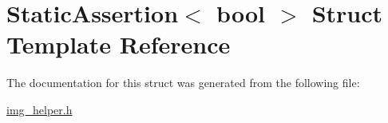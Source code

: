 \hypertarget{struct_static_assertion}{}\section{Static\+Assertion$<$ bool $>$ Struct Template Reference}
\label{struct_static_assertion}


The documentation for this struct was generated from the following file\+:\begin{DoxyCompactItemize}
\item 
\hyperlink{img__helper_8h}{img\+\_\+helper.\+h}\end{DoxyCompactItemize}
